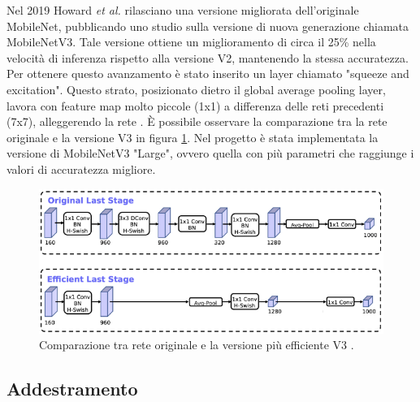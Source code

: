 \documentclass[11pt]{report}
\begin{document}
Nel 2019 Howard \textit{et al.} \cite{howard2019searching} rilasciano una versione migliorata dell'originale MobileNet, pubblicando uno studio sulla versione di nuova generazione chiamata MobileNetV3. Tale versione ottiene un miglioramento di circa il 25\% nella velocità di inferenza rispetto alla versione V2, mantenendo la stessa accuratezza. Per ottenere questo avanzamento è stato inserito un layer chiamato "squeeze and excitation". Questo strato, posizionato dietro il global average pooling layer, lavora con feature map molto piccole (1x1) a differenza delle reti precedenti (7x7), alleggerendo la rete \cite{hollemans}. È possibile osservare la comparazione tra la rete originale e la versione V3 in figura \ref{fig:mobv3}. Nel progetto è stata implementata la versione di MobileNetV3 "Large", ovvero quella con più parametri che raggiunge i valori di accuratezza migliore. 

\begin{figure}
    \centering
    \includegraphics[scale=1]{img/MobileNetV3FinalStage.png}
    \caption{Comparazione tra rete originale e la versione più efficiente V3 \cite{howard2019searching}\cite{hollemans}.}
    \label{fig:mobv3}
\end{figure}

\newpage

\subsection{Addestramento}
\end{document}
